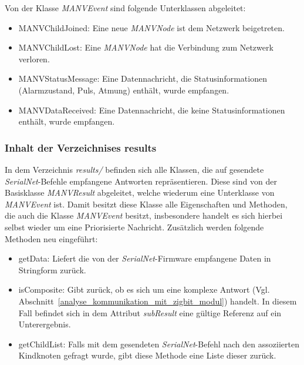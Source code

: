     Von der Klasse \emph{MANVEvent} sind folgende Unterklassen abgeleitet:

    \begin{itemize}
        \item{MANVChildJoined:} Eine neue \emph{MANVNode} ist dem Netzwerk beigetreten.
        \item{MANVChildLost:} Eine \emph{MANVNode} hat die Verbindung zum Netzwerk verloren.
        \item{MANVStatusMessage:} Eine Datennachricht, die Statusinformationen (Alarmzustand, Puls, Atmung) enthält,
                                  wurde empfangen.
        \item{MANVDataReceived:} Eine Datennachricht, die keine Statusinformationen enthält, wurde empfangen.
    \end{itemize}

    \subsubsection{Inhalt der Verzeichnises results}

    In dem Verzeichnis \emph{results/} befinden sich alle Klassen, die auf gesendete \emph{SerialNet}-Befehle empfangene 
    Antworten repräsentieren. Diese sind von der Basisklasse \emph{MANVResult} abgeleitet, welche wiederum eine Unterklasse 
    von \emph{MANVEvent} ist.  Damit besitzt diese Klasse alle Eigenschaften und Methoden, die auch die 
    Klasse \emph{MANVEvent} besitzt, insbesondere handelt es sich hierbei selbst wieder um eine Priorisierte Nachricht. 
    Zusätzlich werden folgende Methoden neu eingeführt:

    \begin{itemize}
        \item{getData:} Liefert die von der \emph{SerialNet}-Firmware empfangene Daten in Stringform zurück. 
        \item{isComposite:} Gibt zurück, ob es sich um eine komplexe Antwort (Vgl. 
                            Abschnitt~\ref{analyse_kommunikation_mit_zigbit_modul}) handelt. In diesem Fall befindet 
                            sich in dem Attribut \emph{subResult} eine gültige Referenz auf ein Unterergebnis.
        \item{getChildList:} Falls mit dem gesendeten \emph{SerialNet}-Befehl nach den assoziierten Kindknoten gefragt wurde,
                             gibt diese Methode eine Liste dieser zurück.
    \end{itemize}

